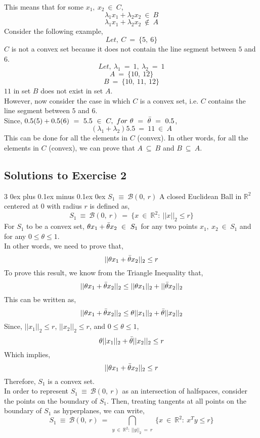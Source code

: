 \documentclass[12pt, draftcls, onecolumn]{IEEEtran}
\makeatletter
\def\subsubsection{\@startsection{subsubsection}%
                                 {3}%
                                 {\z@}%
                                 {0ex plus 0.1ex minus 0.1ex}%
                                 {0ex}%
                                 {\normalfont\normalsize\bfseries}}%
\makeatother
\begin{document}
This means that for some $x_1,\ x_2\ \in\ C$,
\[\lambda_1 x_1 + \lambda_2 x_2\ \in\ B\]
\[\lambda_1 x_1 + \lambda_2 x_2\ \not\in\ A\]
Consider the following example,
\[Let,\ C\ =\ \{5,\ 6\}\]
$C$ is not a convex set because it does not contain the line segment between $5$ and $6$.
\[Let,\ \lambda_1\ =\ 1,\ \lambda_2\ =\ 1\]
\[A\ =\ \{10,\ 12\}\]
\[B\ =\ \{10,\ 11,\ 12\}\]
$11$ in set $B$ does not exist in set $A$.
\\However, now consider the case in which $C$ is a convex set, i.e. $C$ contains the line segment between $5$ and $6$.
\\Since, $0.5(5) + 0.5(6)\ =\ 5.5\ \in\ C,\ for\ \theta\ =\ \Bar{\theta}\ =\ 0.5$, 
\[(\lambda_1+\lambda_2)5.5\ =\ 11\ \in\ A\]
This can be done for all the elements in $C$ (convex). In other words, for all the elements in $C$ (convex), we can prove that $A\ \subseteq\ B$ and $B\ \subseteq\ A$.
\subsection{Solutions to Exercise 2}
\subsubsection{$S_1\ \equiv\ \mathcal{B}(0,\ r)$}
A closed Euclidean Ball in $\mathbb{R}^2$ centered at $0$ with radius $r$ is defined as,
\[S_1\ \equiv\ \mathcal{B}(0,\ r)\ =\ \{x\ \in\ \mathbb{R}^2:\ ||x||_2 \leq r\}\]
For $S_1$ to be a convex set, $\theta x_1 + \Bar{\theta} x_2\ \in\ S_1$ for any two points $x_1,\ x_2\ \in\ S_1$ and for any $0 \leq \theta \leq 1$.
\\In other words, we need to prove that,
\[||\theta x_1 + \Bar{\theta} x_2||_2 \leq r\]
To prove this result, we know from the Triangle Inequality that,
\[||\theta x_1 + \Bar{\theta} x_2||_2 \leq ||\theta x_1||_2 + ||\Bar{\theta} x_2||_2\]
This can be written as,
\[||\theta x_1 + \Bar{\theta} x_2||_2 \leq \theta||x_1||_2 + \Bar{\theta} ||x_2||_2\]
Since, $||x_1||_2 \leq r$, $||x_2||_2 \leq r$, and $0 \leq \theta \leq 1$,
\[\theta||x_1||_2 + \Bar{\theta}||x_2||_2 \leq r\]
Which implies,
\[||\theta x_1 + \Bar{\theta} x_2||_2 \leq r\]
Therefore,
$S_1$ is a convex set.
\\In order to represent $S_1\ \equiv\ \mathcal{B}(0,\ r)$ as an intersection of halfspaces, consider the points on the boundary of $S_1$. Then, treating tangents at all points on the boundary of $S_1$ as hyperplanes, we can write,
\[S_1\ \equiv\ \mathcal{B}(0,\ r)\ =\ \bigcap_{y\ \in\ \mathbb{R}^2:\ ||y||_2\ =\ r}\ \{x\ \in\ \mathbb{R}^2:\ x^T y \leq r\}\]
\end{document}
